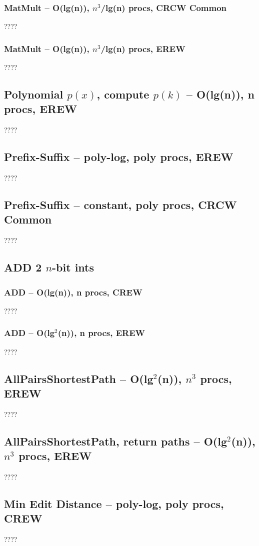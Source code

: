 \documentclass[12pt]{article}
\begin{document}
\subsubsection{MatMult -- O(lg(n)), $n^3$/lg(n) procs, CRCW Common}
????
\subsubsection{MatMult -- O(lg(n)), $n^3$/lg(n) procs, EREW}
????


\subsection{Polynomial $p(x)$, compute $p(k)$ -- O(lg(n)), n procs, EREW}
????


\subsection{Prefix-Suffix -- poly-log, poly procs, EREW}
????


\subsection{Prefix-Suffix -- constant, poly procs, CRCW Common}
????


\subsection{ADD 2 $n$-bit ints}
\subsubsection{ADD -- O(lg(n)), n procs, CREW}
????
\subsubsection{ADD -- O(lg$^2$(n)), n procs, EREW}
????


\subsection{AllPairsShortestPath -- O(lg$^2$(n)), $n^3$ procs, EREW}
????

\subsection{AllPairsShortestPath, return paths -- O(lg$^2$(n)), $n^3$ procs, EREW}
????


\subsection{Min Edit Distance -- poly-log, poly procs, CREW}
????
\end{document}
